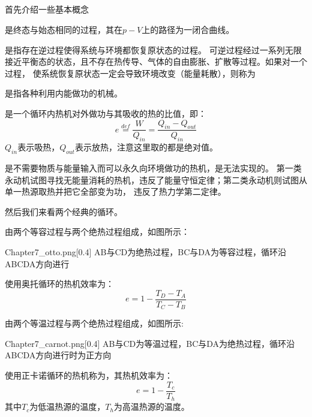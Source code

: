         \subsection[热机]{}
            首先介绍一些基本概念
            \begin{Itemize}
                \item {}是终态与始态相同的过程，其在$p-V$上的路径为一闭合曲线。
                \item {}是指存在逆过程使得系统与环境都恢复原状态的过程。
                可逆过程经过一系列无限接近平衡态的状态，且不存在热传导、气体的自由膨胀、扩散等过程。如果对一个过程，
                使系统恢复原状态一定会导致环境改变（能量耗散），则称为
                \item {}是指各种利用内能做功的机械。
                \item {}是一个循环内热机对外做功与其吸收的热的比值，即：
                \begin{equation}
                    e \overset{def}{=} \frac{W}{Q_{in}} = \frac{Q_{in}-Q_{out}}{Q_{in}}
                    \nonumber
                \end{equation}
                $Q_{in}$表示吸热，$Q_{out}$表示放热，注意这里取的都是绝对值。
                \item {}是不需要物质与能量输入而可以永久向环境做功的热机，是无法实现的。
                第一类永动机试图寻找无能量消耗的热机，违反了能量守恒定律；第二类永动机则试图从单一热源取热并把它全部变为功，
                违反了热力学第二定律。
            \end{Itemize}
            然后我们来看两个经典的循环。

            由两个等容过程与两个绝热过程组成，如图所示：
            \begin{singlefigure}{Chapter7_otto.png}[0.4]
                AB与CD为绝热过程，BC与DA为等容过程，循环沿ABCDA方向进行
            \end{singlefigure}
            使用奥托循环的热机效率为：
            \begin{equation}
                e = 1 - \frac{T_{D} - T_{A}}{T_{C} - T_{B}}
                \nonumber
            \end{equation}
            
            由两个等温过程与两个绝热过程组成，如图所示:
            \begin{singlefigure}{Chapter7_carnot.png}[0.4]
                AB与CD为等温过程，BC与DA为绝热过程，循环沿ABCDA方向进行时为正方向
            \end{singlefigure}
            使用正卡诺循环的热机称为，其热机效率为：
            \begin{equation}
                e = 1 - \frac{T_{c}}{T_{h}}
                \nonumber
            \end{equation}
            其中$T_c$为低温热源的温度，$T_h$为高温热源的温度。

